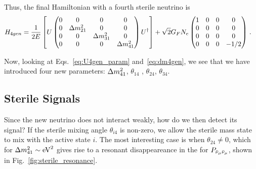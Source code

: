 Thus, the final Hamiltonian with a fourth sterile neutrino is 
\begin{align}\label{eq:H_4gen}
    H_{4gen} &= \frac{1}{2E}\left[U \begin{pmatrix}
            0 & 0 & 0 & 0\\
            0 & \dm_{21} & 0  & 0 \\
            0 & 0 & \dm_{31} & 0 \\
            0 & 0 & 0 & \dm_{41} \\
        \end{pmatrix} U^\dagger\right] + \sqrt{2}G_F N_e 
        \begin{pmatrix}
            1 & 0 & 0 & 0 \\
            0 & 0 & 0 & 0 \\
            0 & 0 & 0 & 0 \\
            0 & 0 & 0 & -1/2
        \end{pmatrix}\,. 
\end{align}

Now, looking at Eqs.~\ref{eq:U4gen_param} and~\ref{eq:dm4gen}, we see that we have introduced four new parameters: $\dm[41]$, $\theta_{14}$
, $\theta_{24}$, $\theta_{34}$. 

\subsection{Sterile Signals}
Since the new neutrino does not interact weakly, how do we then detect its signal? If the sterile mixing angle $\theta_{i4}$ is non-zero, 
we allow the sterile mass state to mix with the active state $i$. The most interesting case is when $\theta_{24} \neq 0$, 
which for $\dm[41] \sim \si{\eV \squared}$ gives rise to a resonant disappeareance in the for $P_{\bar{\nu}_\mu\bar{\nu}_\mu}$, shown in Fig.~\ref{fig:sterile_resonance}.

